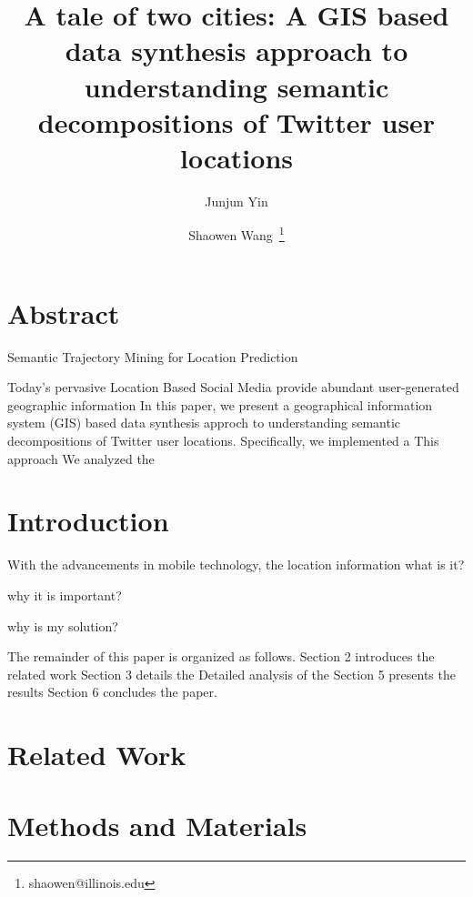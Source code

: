 \documentclass[a4paper,11pt]{article}
\begin{document}
\title{A tale of two cities: A GIS based data synthesis approach to understanding semantic decompositions of Twitter user locations}
\author{Junjun Yin}
\author{Shaowen Wang~\thanks{shaowen@illinois.edu}}
\renewcommand\Authands{ and }
\maketitle

\section*{Abstract}
Semantic Trajectory Mining for Location Prediction

Today's pervasive Location Based Social Media provide abundant user-generated geographic information
In this paper, we present a geographical information system (GIS) based data synthesis approch to understanding semantic decompositions of Twitter user locations.
Specifically, we implemented a
This approach 
We analyzed the 

\section{Introduction}
With the advancements in mobile technology, the location information 
what is it?

why it is important?

why is my solution?

The remainder of this paper is organized as follows. Section 2 introduces the related work 
Section 3 details the 
Detailed analysis of the
Section 5 presents the results
Section 6 concludes the paper.

\section{Related Work}



\section{Methods and Materials}
\end{document}
